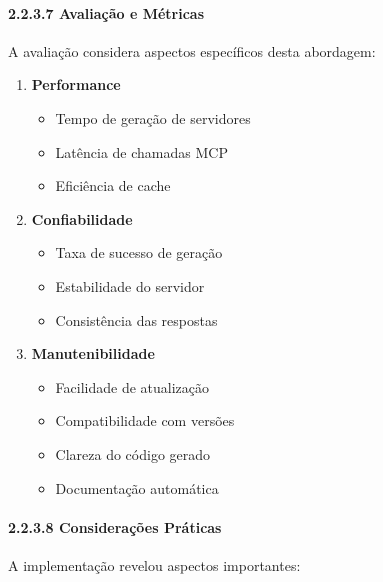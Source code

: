 \documentclass[
]{article}
\providecommand{\tightlist}{%
  \setlength{\itemsep}{0pt}\setlength{\parskip}{0pt}}
\begin{document}
\paragraph{2.2.3.7 Avaliação e
Métricas}\label{avaliauxe7uxe3o-e-muxe9tricas-1}

A avaliação considera aspectos específicos desta abordagem:

\begin{enumerate}
\def\labelenumi{\arabic{enumi}.}
\item
  \textbf{Performance}

  \begin{itemize}
  \tightlist
  \item
    Tempo de geração de servidores
  \item
    Latência de chamadas MCP
  \item
    Eficiência de cache
  \end{itemize}
\item
  \textbf{Confiabilidade}

  \begin{itemize}
  \tightlist
  \item
    Taxa de sucesso de geração
  \item
    Estabilidade do servidor
  \item
    Consistência das respostas
  \end{itemize}
\item
  \textbf{Manutenibilidade}

  \begin{itemize}
  \tightlist
  \item
    Facilidade de atualização
  \item
    Compatibilidade com versões
  \item
    Clareza do código gerado
  \item
    Documentação automática
  \end{itemize}
\end{enumerate}

\paragraph{2.2.3.8 Considerações
Práticas}\label{considerauxe7uxf5es-pruxe1ticas-1}

A implementação revelou aspectos importantes:
\end{document}
